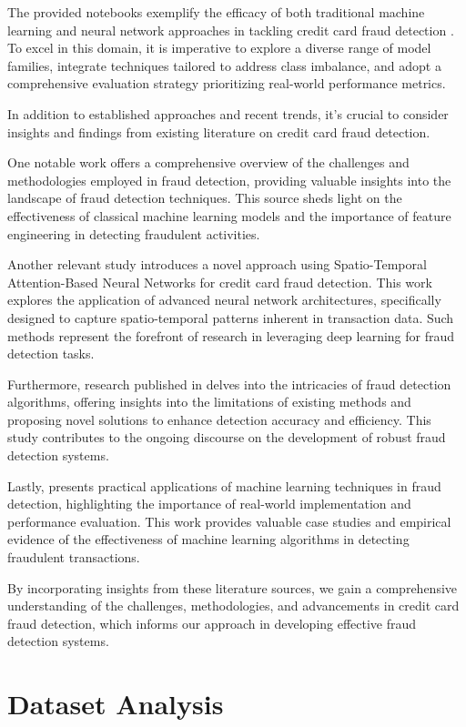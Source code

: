 \documentclass[conference]{IEEEtran}
\begin{document}
The provided notebooks exemplify the efficacy of both traditional machine learning and neural network approaches in tackling credit card fraud detection \cite{b2, b3}. To excel in this domain, it is imperative to explore a diverse range of model families, integrate techniques tailored to address class imbalance, and adopt a comprehensive evaluation strategy prioritizing real-world performance metrics.

In addition to established approaches and recent trends, it's crucial to consider insights and findings from existing literature on credit card fraud detection.

One notable work \cite{b4} offers a comprehensive overview of the challenges and methodologies employed in fraud detection, providing valuable insights into the landscape of fraud detection techniques. This source sheds light on the effectiveness of classical machine learning models and the importance of feature engineering in detecting fraudulent activities.

Another relevant study \cite{b5} introduces a novel approach using Spatio-Temporal Attention-Based Neural Networks for credit card fraud detection. This work explores the application of advanced neural network architectures, specifically designed to capture spatio-temporal patterns inherent in transaction data. Such methods represent the forefront of research in leveraging deep learning for fraud detection tasks.

Furthermore, research published in \cite{b6} delves into the intricacies of fraud detection algorithms, offering insights into the limitations of existing methods and proposing novel solutions to enhance detection accuracy and efficiency. This study contributes to the ongoing discourse on the development of robust fraud detection systems.

Lastly, \cite{b7} presents practical applications of machine learning techniques in fraud detection, highlighting the importance of real-world implementation and performance evaluation. This work provides valuable case studies and empirical evidence of the effectiveness of machine learning algorithms in detecting fraudulent transactions.

By incorporating insights from these literature sources, we gain a comprehensive understanding of the challenges, methodologies, and advancements in credit card fraud detection, which informs our approach in developing effective fraud detection systems.

\section{Dataset Analysis}
\end{document}
